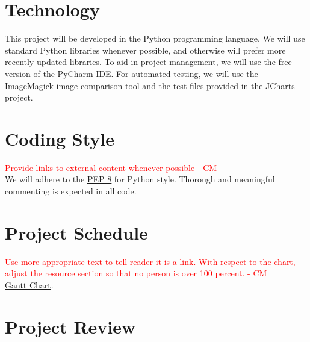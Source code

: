 \documentclass{article}
\begin{document}
\section{Technology} %
This project will be developed in the Python programming language. We will use standard Python libraries whenever possible, and otherwise will prefer more recently updated libraries. To aid in project management, we will use the free version of the PyCharm IDE.  For automated testing, we will use the ImageMagick image comparison tool and the test files provided in the JCharts project.

\section{Coding Style} %

\textcolor{red}{Provide links to external content whenever possible  - CM} \\
We will adhere to the \href{https://www.python.org/dev/peps/pep-0008/}{\underline{PEP 8}} for Python style. Thorough and meaningful commenting is expected in all code.

\section{Project Schedule}


\textcolor{red}{Use more appropriate text to tell reader it is a link. With respect to the chart, adjust the resource section so that no person is over 100 percent. - CM} \\
 \href{run:../DevelopmentPlan/GanttChart.gan} {\underline{Gantt Chart}}.

\section{Project Review} 
\end{document}
